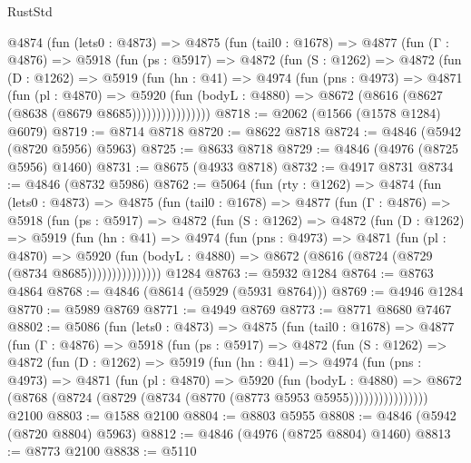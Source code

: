 \begin{lexlean}{RustStd}
\begin{coremodule}
      @4874
        (fun (lets0 : @4873) =>
        @4875
          (fun (tail0 : @1678) =>
          @4877
            (fun (Γ : @4876) =>
            @5918
              (fun (ps : @5917) =>
              @4872
                (fun (S : @1262) =>
                @4872
                  (fun (D : @1262) =>
                  @5919
                    (fun (hn : @41) =>
                    @4974
                      (fun (pns : @4973) =>
                      @4871
                        (fun (pl : @4870) =>
                        @5920
                          (fun (bodyL : @4880) =>
                          @8672 (@8616 (@8627 (@8638 (@8679 @8685))))))))))))))))
@8718 := @2062 (@1566 (@1578 @1284) @6079)
@8719 := @8714 @8718
@8720 := @8622 @8718
@8724 := @4846 (@5942 (@8720 @5956) @5963)
@8725 := @8633 @8718
@8729 := @4846 (@4976 (@8725 @5956) @1460)
@8731 := @8675 (@4933 @8718)
@8732 := @4917 @8731
@8734 := @4846 (@8732 @5986)
@8762 := @5064
    (fun (rty : @1262) =>
    @4874
      (fun (lets0 : @4873) =>
      @4875
        (fun (tail0 : @1678) =>
        @4877
          (fun (Γ : @4876) =>
          @5918
            (fun (ps : @5917) =>
            @4872
              (fun (S : @1262) =>
              @4872
                (fun (D : @1262) =>
                @5919
                  (fun (hn : @41) =>
                  @4974
                    (fun (pns : @4973) =>
                    @4871
                      (fun (pl : @4870) =>
                      @5920
                        (fun (bodyL : @4880) =>
                        @8672 (@8616 (@8724 (@8729 (@8734 @8685)))))))))))))))
    @1284
@8763 := @5932 @1284
@8764 := @8763 @4864
@8768 := @4846 (@8614 (@5929 (@5931 @8764)))
@8769 := @4946 @1284
@8770 := @5989 @8769
@8771 := @4949 @8769
@8773 := @8771 @8680 @7467
@8802 := @5086
    (fun (lets0 : @4873) =>
    @4875
      (fun (tail0 : @1678) =>
      @4877
        (fun (Γ : @4876) =>
        @5918
          (fun (ps : @5917) =>
          @4872
            (fun (S : @1262) =>
            @4872
              (fun (D : @1262) =>
              @5919
                (fun (hn : @41) =>
                @4974
                  (fun (pns : @4973) =>
                  @4871
                    (fun (pl : @4870) =>
                    @5920
                      (fun (bodyL : @4880) =>
                      @8672 (@8768 (@8724 (@8729 (@8734 (@8770 (@8773 @5953 @5955))))))))))))))))
    @2100
@8803 := @1588 @2100
@8804 := @8803 @5955
@8808 := @4846 (@5942 (@8720 @8804) @5963)
@8812 := @4846 (@4976 (@8725 @8804) @1460)
@8813 := @8773 @2100
@8838 := @5110

\end{coremodule}
\end{lexlean}
